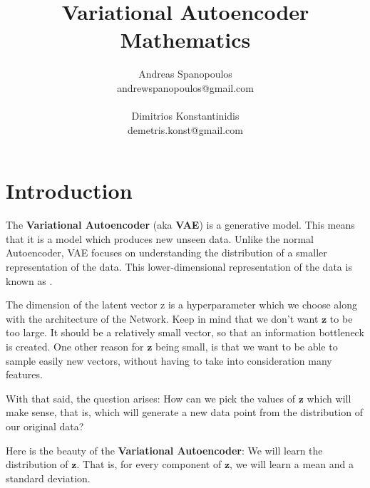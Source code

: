 \documentclass[12pt]{report}
\title{Variational Autoencoder Mathematics}
\author{\LARGE{Andreas Spanopoulos} \\ andrewspanopoulos@gmail.com \\ \\
        \LARGE{Dimitrios Konstantinidis} \\ demetris.konst@gmail.com \\}
\begin{document}
\maketitle

\section*{Introduction}
\smallskip

The \textbf{Variational Autoencoder} (aka \textbf{VAE}) is a generative model.
This means that it is a model which produces new unseen data. Unlike the normal
Autoencoder, VAE focuses on understanding the distribution of a smaller
representation of the data. This lower-dimensional representation of the data is
known as .
\bigskip

The dimension of the latent vector z is a hyperparameter which we choose along
with the architecture of the Network. Keep in mind that we don't want
$\textbf{z}$ to be too large. It should be a relatively small vector, so that an
information bottleneck is created. One other reason for $\textbf{z}$ being small,
is that we want to be able to sample easily new vectors, without having to take
into consideration many features.
\bigskip

With that said, the question arises: How can we pick the values of $\textbf{z}$
which will make sense, that is, which will generate a new data point from the
distribution of our original data?
\bigskip

Here is the beauty of the \textbf{Variational Autoencoder}: We will learn the
distribution of $\textbf{z}$. That is, for every component of $\textbf{z}$, we
will learn a mean and a standard deviation.
\bigskip
\end{document}
